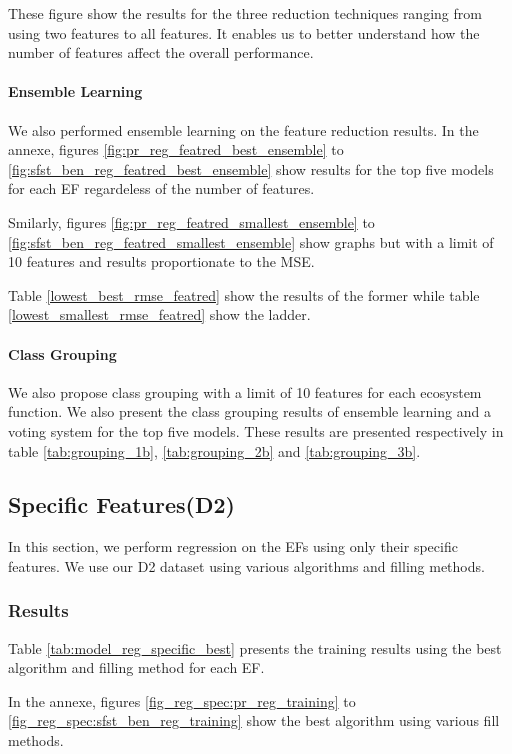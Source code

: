 \documentclass[12pt,letterpaper]{article}
\begin{document}
These figure show the results for the three reduction techniques ranging from using two features to all features.
It enables us to better understand how the number of features affect the overall performance.


\paragraph{Ensemble Learning}
We also performed ensemble learning on the feature reduction results.
In the annexe, figures \ref{fig:pr_reg_featred_best_ensemble} to \ref{fig:sfst_ben_reg_featred_best_ensemble} show results for the top five models for each \ac{EF} regardeless of the number of features.

Smilarly, figures \ref{fig:pr_reg_featred_smallest_ensemble} to \ref{fig:sfst_ben_reg_featred_smallest_ensemble} show graphs but with a limit of 10 features and results proportionate to the MSE.


Table \ref{lowest_best_rmse_featred} show the results of the former while table \ref{lowest_smallest_rmse_featred} show the ladder.

\paragraph{Class Grouping}
We also propose class grouping with a limit of 10 features for each ecosystem function.
We also present the class grouping results of ensemble learning and a voting system for the top five models.
These results are presented respectively in table \ref{tab:grouping_1b}, \ref{tab:grouping_2b} and \ref{tab:grouping_3b}.





\subsection{Specific Features(D2)}
In this section, we perform regression on the \ac{EF}s using only their specific features.
We use our D2 dataset using various algorithms and filling methods.

\subsubsection{Results}
Table \ref{tab:model_reg_specific_best} presents the training results using the best algorithm and filling method for each \ac{EF}.


In the annexe, figures \ref{fig_reg_spec:pr_reg_training} to \ref{fig_reg_spec:sfst_ben_reg_training} show the best algorithm using various fill methods.
\end{document}
